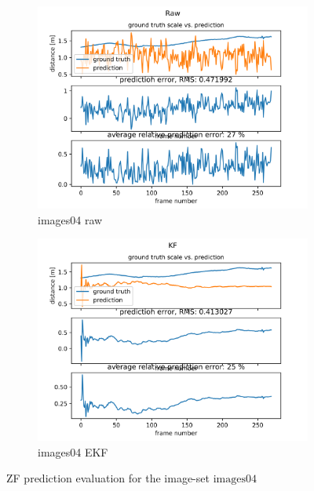\documentclass{article}
\begin{document}
\begin{figure}[h!]
	\begin{subfigure}{.5\textwidth}
		\includegraphics[width=\linewidth]{images4_test_ZF_raw}
		\caption{images04 raw}		
		\label{fig:ZF_images4_test_raw}
	\end{subfigure}
	\begin{subfigure}{.5\textwidth}
		\includegraphics[width=\linewidth]{images4_test_ZF_smooth}
		\caption{images04 EKF}		
		\label{fig:ZF_images4_test_smooth}
	\end{subfigure}
	\caption{ZF prediction evaluation for the image-set $\mathrm{images04}$}
	\label{fig:ZF_results_images4}
\end{figure}
\end{document}
